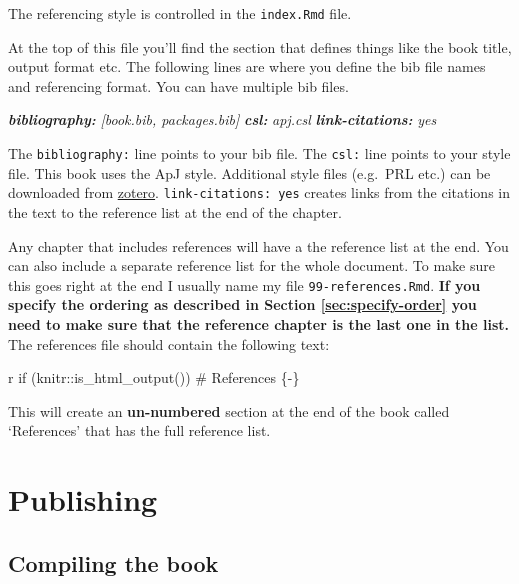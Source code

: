 \documentclass[
]{book}
\newenvironment{Shaded}{\begin{snugshade}}{\end{snugshade}}
\newcommand{\AnnotationTok}[1]{\textcolor[rgb]{0.56,0.35,0.01}{\textbf{\textit{#1}}}}
\newcommand{\AttributeTok}[1]{\textcolor[rgb]{0.13,0.29,0.53}{#1}}
\newcommand{\CommentTok}[1]{\textcolor[rgb]{0.56,0.35,0.01}{\textit{#1}}}
\newcommand{\StringTok}[1]{\textcolor[rgb]{0.31,0.60,0.02}{#1}}
\begin{document}
The referencing style is controlled in the \texttt{index.Rmd} file.

At the top of this file you'll find the section that defines things like the book title, output format etc. The following lines are where you define the bib file names and referencing format. You can have multiple bib files.

\begin{Shaded}
\begin{Highlighting}[]
\AnnotationTok{bibliography:}\CommentTok{ [book.bib, packages.bib]}
\AnnotationTok{csl:}\CommentTok{ apj.csl}
\AnnotationTok{link{-}citations:}\CommentTok{ yes}
\end{Highlighting}
\end{Shaded}

The \texttt{bibliography:} line points to your bib file. The \texttt{csl:} line points to your style file. This book uses the ApJ style. Additional style files (e.g.~PRL etc.) can be downloaded from \href{https://www.zotero.org/styles}{zotero}. \texttt{link-citations:\ yes} creates links from the citations in the text to the reference list at the end of the chapter.

Any chapter that includes references will have a the reference list at the end. You can also include a separate reference list for the whole document. To make sure this goes right at the end I usually name my file \texttt{99-references.Rmd}. \textbf{If you specify the ordering as described in Section \ref{sec:specify-order} you need to make sure that the reference chapter is the last one in the list.} The references file should contain the following text:

\begin{Shaded}
\begin{Highlighting}[]
\StringTok{\textasciigrave{}}\AttributeTok{r if (knitr::is\_html\_output()) \textquotesingle{}\# References \{{-}\}\textquotesingle{}}\StringTok{\textasciigrave{}}
\end{Highlighting}
\end{Shaded}

This will create an \textbf{un-numbered} section at the end of the book called `References' that has the full reference list.

\chapter{Publishing}\label{sec:publishing}

\section{Compiling the book}\label{sec:create-book}
\end{document}
